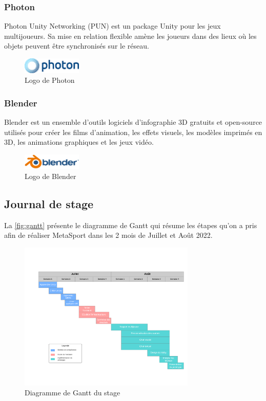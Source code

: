 \documentclass[12pt,a4paper,oneside,french]{book}
\begin{document}
\subsubsection*{Photon}
Photon Unity Networking (PUN) \cite{Photon} est un package Unity pour les jeux multijoueurs. Sa mise en relation flexible
amène les joueurs dans des lieux où les objets peuvent être synchronisés sur le réseau.
\begin{figure}[H]
    \centering
    \includegraphics[width=0.25\textwidth]{figure/photon.png}
    \caption{Logo de Photon}
    \label{fig:photon}
\end{figure}
\noindent

\subsubsection*{Blender}
Blender \cite{blender} est un ensemble d'outils logiciels d'infographie 3D gratuits et open-source utilisés pour créer les
films d'animation, les effets visuels, les modèles imprimés en 3D,  les animations graphiques et les jeux vidéo.
\begin{figure}[H]
    \centering
    \includegraphics[width=0.25\textwidth]{figure/blender.png}
    \caption{Logo de Blender}
    \label{fig:blender}
\end{figure}
\noindent
\newpage
\subsection{Journal de stage}
La \autoref{fig:gantt} présente le diagramme de Gantt qui résume les étapes qu'on a pris afin de réaliser MetaSport dans les 2 mois de Juillet et Août 2022.
\begin{figure}[H]
    \centering
    \includegraphics[width=0.75\textwidth]{figure/gantt.png}
    \caption{Diagramme de Gantt du stage}
    \label{fig:gantt}
\end{figure}
\noindent
\end{document}
